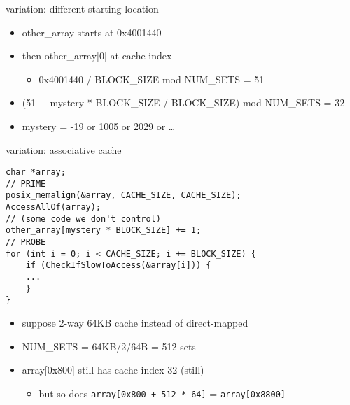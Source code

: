 

\begin{frame}{variation: different starting location}
    \begin{itemize}
    \item other\_array starts at 0x4001440
    \item then other\_array[0] at cache index 
        \begin{itemize}
        \item 0x4001440 / BLOCK\_SIZE mod NUM\_SETS = 51
        \end{itemize}
    \item (51 + mystery * BLOCK\_SIZE / BLOCK\_SIZE) mod NUM\_SETS = 32
    \item mystery = -19 or 1005 or 2029 or \ldots
    \end{itemize}
\end{frame}

\begin{frame}[fragile]{variation: associative cache}
\begin{Verbatim}[fontsize=\fontsize{9}{10}]
char *array;
// PRIME
posix_memalign(&array, CACHE_SIZE, CACHE_SIZE);
AccessAllOf(array);
// (some code we don't control)
other_array[mystery * BLOCK_SIZE] += 1;
// PROBE
for (int i = 0; i < CACHE_SIZE; i += BLOCK_SIZE) {
    if (CheckIfSlowToAccess(&array[i])) {
    ...
    }
}
\end{Verbatim}
    \begin{itemize}
    \item suppose 2-way 64KB cache instead of direct-mapped
    \item NUM\_SETS = 64KB/2/64B = 512 sets
    \item array[0x800] still has cache index 32 (still)
        \begin{itemize}
        \item but so does \texttt{array[0x800 + 512 * 64]} = \texttt{array[0x8800]}
        \end{itemize}
    \end{itemize}
\end{frame}

